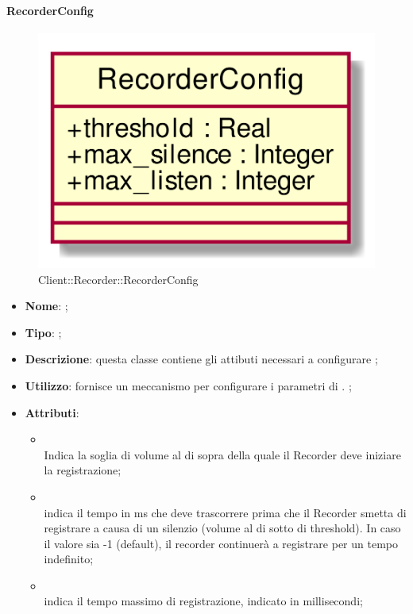 \hypertarget{RecorderConfig_label}{\paragraph{RecorderConfig}}
\begin{figure}[h]
	\centering
	\includegraphics[width=\textwidth,height=\textheight,keepaspectratio]{images/ClassRecorderConfig.png}
	\caption{Client::Recorder::RecorderConfig}
\end{figure}
\begin{itemize}
	\item \textbf{Nome}: ;
	\item \textbf{Tipo}: ;
	\item \textbf{Descrizione}: questa classe contiene gli attibuti necessari a configurare ;
	\item \textbf{Utilizzo}: fornisce un meccanismo per configurare i parametri di . ;
	\item \textbf{Attributi}:
	\begin{itemize}
		\item[]  \\
		Indica la soglia di volume al di sopra della quale il Recorder deve iniziare la registrazione;
		\item[]  \\
		indica il tempo in ms che deve trascorrere prima che il Recorder smetta di registrare a causa di un silenzio (volume al di sotto di threshold). In caso il valore sia -1 (default), il recorder continuerà a registrare per un tempo indefinito;
		\item[]  \\
		indica il tempo massimo di registrazione, indicato in millisecondi;
	\end{itemize}
\end{itemize}

